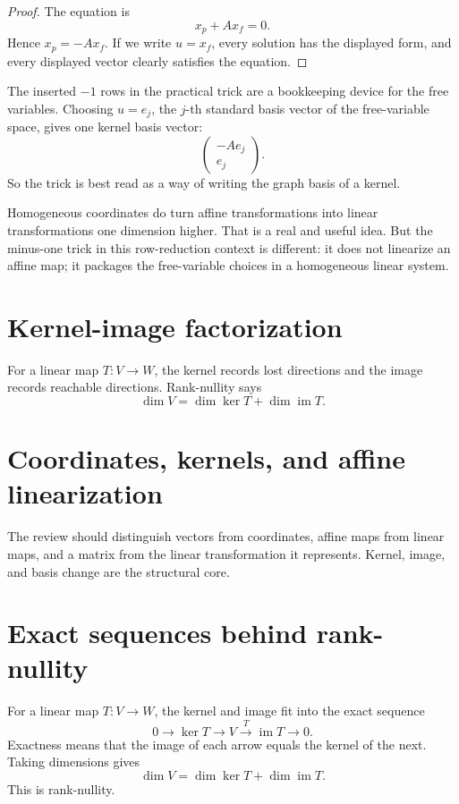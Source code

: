 \begin{proof}
The equation is
\[
  x_p+A x_f=0.
\]
Hence \(x_p=-A x_f\).  If we write \(u=x_f\), every solution has the displayed form, and every displayed vector clearly satisfies the equation.
\end{proof}

The inserted \(-1\) rows in the practical trick are a bookkeeping device for the free variables.  Choosing \(u=e_j\), the \(j\)-th standard basis vector of the free-variable space, gives one kernel basis vector:
\[
  \begin{pmatrix}-Ae_j\\ e_j\end{pmatrix}.
\]
So the trick is best read as a way of writing the graph basis of a kernel.

\begin{remark}
Homogeneous coordinates do turn affine transformations into linear transformations one dimension higher.  That is a real and useful idea.  But the minus-one trick in this row-reduction context is different: it does not linearize an affine map; it packages the free-variable choices in a homogeneous linear system.
\end{remark}
\section{Kernel-image factorization}
For a linear map \(T:V\to W\), the kernel records lost directions and the image records reachable directions.  Rank-nullity says
\[
\dim V=\dim\ker T+\dim\operatorname{im}T.
\]
\section{Coordinates, kernels, and affine linearization}
The review should distinguish vectors from coordinates, affine maps from linear maps, and a matrix from the linear transformation it represents.  Kernel, image, and basis change are the structural core.

\section{Exact sequences behind rank-nullity}

For a linear map $T:V\to W$, the kernel and image fit into the exact sequence
\[
  0\to \ker T \to V \xrightarrow{T} \operatorname{im}T \to 0.
\]
Exactness means that the image of each arrow equals the kernel of the next.  Taking dimensions gives
\[
  \dim V=\dim \ker T+\dim \operatorname{im}T.
\]
This is rank-nullity.

